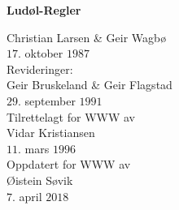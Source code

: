 \documentclass[a4paper, 12pt, norsk]{article}
\begin{document}

\thispagestyle{empty} %

\vspace*{-1.65cm}

\begin{center}
  \textbf{\LARGE Ludøl-Regler} \bigskip \large
  
  Christian Larsen \& Geir Wagbø \\ \normalsize
  $17$. oktober $1987$ \medskip \\
  \normalsize
  Revideringer: \\ \large
  Geir Bruskeland \& Geir Flagstad \\ \normalsize
  $29$. september $1991$ \medskip \\
  \normalsize
  Tilrettelagt for WWW av \\ \large
  Vidar Kristiansen \\ \normalsize
  $11$. mars $1996$ \medskip \\
  \normalsize
  Oppdatert for WWW av \\ \large
  Øistein Søvik \\ \normalsize 
  $7$. april $2018$ \bigskip
\end{center}



\end{document}
